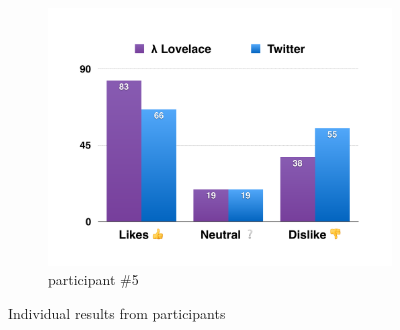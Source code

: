 \documentclass{article}
\begin{document}
\begin{figure}
    \begin{subfigure}[b]{0.48\textwidth}
        \includegraphics[page=5,width=\textwidth]{evaluation_charts}
        \caption{participant \#5}
        \label{fig:participant5}
    \end{subfigure}
    
    \vspace{2em}
    
    \caption{Individual results from participants}
    \label{fig:evaluation-results}
\end{figure}



\newpage


%
%
%
\end{document}

